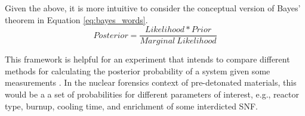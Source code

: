 Given the above, it is more intuitive to consider the conceptual version of
Bayes' theorem in Equation \ref{eq:bayes_words}.
\begin{equation}
  \label{eq:bayes_words}
  Posterior = \frac{Likelihood * Prior}{Marginal \ Likelihood} 
\end{equation} 

This framework is helpful for an experiment that intends to compare different
methods for calculating the posterior probability of a system given some
measurements \cite{bayes_compare}.  In the nuclear forensics context of
pre-detonated materials, this would be a a set of probabilities for different
parameters of interest, e.g., reactor type, burnup, cooling time, and
enrichment of some interdicted \gls{SNF}.
